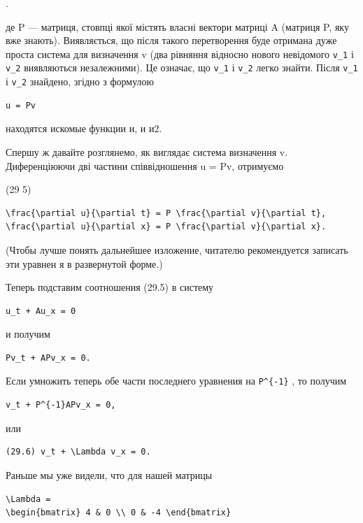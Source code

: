 \documentclass[
  ukrainian,
]{article}
\begin{document}
.

де P --- матриця, стовпці якої містять власні вектори матриці A (матриця
P, яку вже знають). Виявляється, що після такого перетворення буде
отримана дуже проста система для визначення v (два рівняння відносно
нового невідомого \texttt{v\_1} і \texttt{v\_2} виявляються
незалежними). Це означає, що \texttt{v\_1} і \texttt{v\_2} легко знайти.
Після \texttt{v\_1} і \texttt{v\_2} знайдено, згідно з формулою

\begin{verbatim}
u = Pv
\end{verbatim}

находятся искомые функции и, и и2.

Спершу ж давайте розглянемо, як виглядає система визначення v.
Диференціюючи дві частини співвідношення u = Pv, отримуємо

(29 5)

\begin{verbatim}
\frac{\partial u}{\partial t} = P \frac{\partial v}{\partial t},
\frac{\partial u}{\partial x} = P \frac{\partial v}{\partial x}.
\end{verbatim}

(Чтобы лучше понять дальнейшее изложение, читателю рекомендуется
записать эти уравнен я в развернутой форме.)

Теперь подставим соотношения (29.5) в систему

\begin{verbatim}
u_t + Au_x = 0
\end{verbatim}

и получим

\begin{verbatim}
Pv_t + APv_x = 0.
\end{verbatim}

Если умножить теперь обе части последнего уравнения на
\texttt{P\^{}\{-1\}} , то получим

\begin{verbatim}
v_t + P^{-1}APv_x = 0,
\end{verbatim}

или

\begin{verbatim}
(29.6) v_t + \Lambda v_x = 0.
\end{verbatim}

Раньше мы уже видели, что для нашей матрицы

\begin{verbatim}
\Lambda =
\begin{bmatrix} 4 & 0 \\ 0 & -4 \end{bmatrix}
\end{verbatim}
\end{document}
